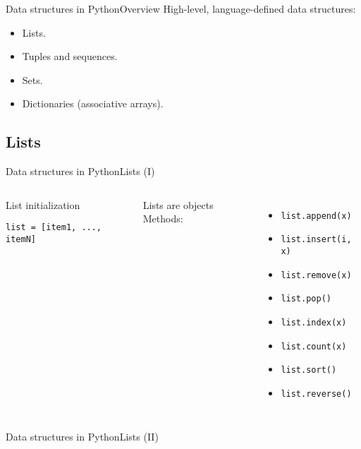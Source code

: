 \documentclass[10pt,compress]{beamer} %
\begin{document}
\begin{frame}{Data structures in Python}{Overview}
	High-level, language-defined data structures:
	\begin{itemize}
		\item Lists.
		\item Tuples and sequences.
		\item Sets.
		\item Dictionaries (associative arrays).
	\end{itemize}
\end{frame}

\subsection{Lists}
\begin{frame}[fragile]{Data structures in Python}{Lists (I)}
    \begin{columns}
	   \begin{block}{List initialization}
\begin{verbatim}
list = [item1, ..., itemN]
\end{verbatim}
	   \end{block}
	   Lists are objects
	Methods:
	\begin{itemize}
		\item \texttt{list.append(x)}
		\item \texttt{list.insert(i, x)}
		\item \texttt{list.remove(x)}
		\item \texttt{list.pop()}
		\item \texttt{list.index(x)}
		\item \texttt{list.count(x)}
		\item \texttt{list.sort()}
		\item \texttt{list.reverse()}
	\end{itemize}
   \end{columns}
\end{frame}

\begin{frame}[shrink]{Data structures in Python}{Lists (II)}
\scriptsize{
		\begin{block}{}
		\vspace{-0.4cm}
		
		\vspace{-0.2cm}
		\end{block}
		}
\end{frame}
\end{document}

